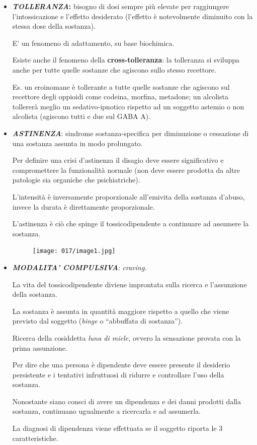 \begin{itemize}
\item
  \textbf{\emph{TOLLERANZA}:} bisogno di dosi sempre più elevate per
  raggiungere l'intossicazione e l'effetto desiderato (l'effetto è
  notevolmente diminuito con la stessa dose della sostanza).

E' un fenomeno di adattamento, su base biochimica.

Esiste anche il fenomeno della \textbf{cross-tolleranza}: la tolleranza
si sviluppa anche per tutte quelle sostanze che agiscono sullo stesso
recettore.

Es. un eroinomane è tollerante a tutte quelle sostanze che agiscono sul
recettore degli oppioidi come codeina, morfina, metadone; un alcolista
tollererà meglio un sedativo-ipnotico rispetto ad un soggetto astemio o
non alcolista (agiscono tutti e due sul GABA A).

\item
  \textbf{\emph{ASTINENZA}}: sindrome sostanza-specifica per diminuzione
  o cessazione di una sostanza assunta in modo prolungato.

Per definire una crisi d'astinenza il disagio deve essere significativo
e compromettere la funzionalità normale (non deve essere prodotta da
altre patologie sia organiche che psichiatriche).

L'intensità è inversamente proporzionale all'emivita della sostanza
d'abuso, invece la durata è direttamente proporzionale.

L'astinenza è ciò che spinge il tossicodipendente a continuare ad
assumere la sostanza. 

\begin{figure}[!ht]
\centering
	\texttt{[image: 017/image1.jpg]}
\end{figure}

\item
  \textbf{\emph{MODALITA' COMPULSIVA}}: \emph{craving. }

La vita del tossicodipendente diviene improntata sulla ricerca e
l'assunzione della sostanza.

La sostanza è assunta in quantità maggiore rispetto a quello che viene
previsto dal soggetto (\emph{binge} o ``abbuffata di sostanza'').

Ricerca della cosiddetta \emph{luna di miele,} ovvero la sensazione
provata con la prima assunzione.

Per dire che una persona è dipendente deve essere presente il desiderio
persistente e i tentativi infruttuosi di ridurre e controllare l'uso
della sostanza.

Nonostante siano consci di avere un dipendenza e dei danni prodotti
dalla sostanza, continuano ugualmente a ricercarla e ad assumerla.

La diagnosi di dipendenza viene effettuata se il soggetto riporta le 3 caratteristiche.

\end{itemize}

